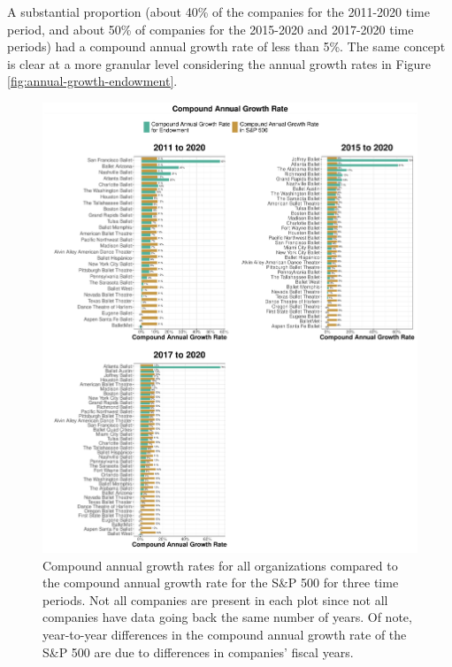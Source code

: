 \documentclass[Dance Data
Project,article,submit,moreauthors,pdftex]{mdpi}
\begin{document}
A substantial proportion (about 40\% of the companies for the 2011-2020
time period, and about 50\% of companies for the 2015-2020 and 2017-2020
time periods) had a compound annual growth rate of less than 5\%. The
same concept is clear at a more granular level considering the annual
growth rates in Figure \ref{fig:annual-growth-endowment}.

\begin{figure}[H]
\includegraphics[width=0.9\linewidth,]{../images/compound-growth} \caption{\label{fig:compound-growth} Compound annual growth rates for all organizations compared to the compound annual growth rate for the S\&P 500 for three time periods. Not all companies are present in each plot since not all companies have data going back the same number of years. Of note, year-to-year differences in the compound annual growth rate of the S\&P 500 are due to differences in companies' fiscal years.}\label{fig:unnamed-chunk-12}
\end{figure}
\end{document}
